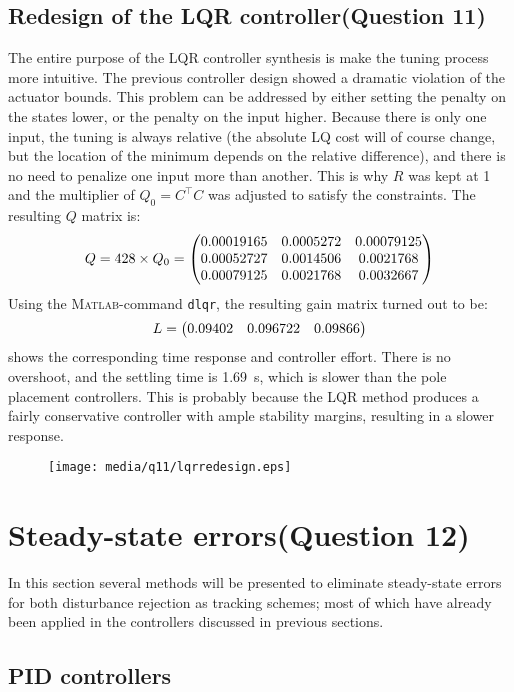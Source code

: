 \subsection{Redesign of the LQR controller\textnormal{\phantom{xxx}(Question 11)}}
\label{sec:retunelqr}
The entire purpose of the LQR controller synthesis is make the tuning process more intuitive. The previous controller design showed a dramatic violation of the actuator bounds. This problem can be addressed by either setting the penalty on the states lower, or the penalty on the input higher. Because there is only one input, the tuning is always relative (the absolute LQ cost will of course change, but the location of the minimum depends on the relative difference), and there is no need to penalize one input more than another. This is why $R$ was kept at 1 and the multiplier of $Q_0 = C^\top C$ was adjusted to satisfy the constraints. The resulting $Q$ matrix is:
$$ Q = 428\times Q_0 = \mqty(0.00019165 & 0.0005272 &  0.00079125\\
                             0.00052727 & 0.0014506 &  0.0021768\\
                             0.00079125 & 0.0021768 &  0.0032667\\) $$
Using the \textsc{Matlab}-command \texttt{dlqr}, the resulting gain matrix turned out to be:
 $$L = \mqty(0.09402 & 0.096722 & 0.09866)$$
 shows the corresponding time response and controller effort. There is no overshoot, and the settling time is \SI{1.69}{\second}, which is slower than the pole placement controllers. This is probably because the LQR method produces a fairly conservative controller with ample stability margins, resulting in a slower response.
\begin{figure}[ht]
    \centering
    \texttt{[image: media/q11/lqrredesign.eps]}
    \caption{}
    \label{fig:q11_lqrredesign}
\end{figure}

\clearpage
\section{Steady-state errors\textnormal{\phantom{xxx}(Question 12)}}
\label{sec:q12}
In this section several methods will be presented to eliminate steady-state errors for both disturbance rejection as tracking schemes; most of which have already been applied in the controllers discussed in previous sections. \cite{nise}
\subsection*{PID controllers}
